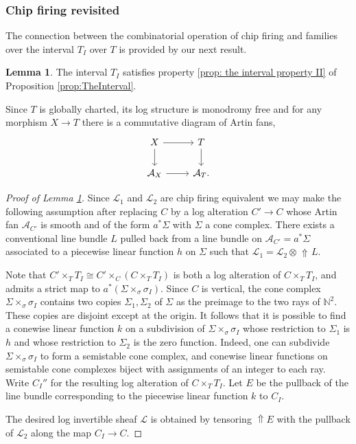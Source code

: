 \documentclass[11pt]{amsart}
\theoremstyle{definition}
\theoremstyle{definition}
\newtheorem{lemma}[theorem]{Lemma}
\DeclareMathOperator{\arrowup}{\!\Uparrow \!}
\begin{document}
\subsubsection{Chip firing revisited} The connection between the combinatorial operation of chip firing and families over the interval $T_I$ over $T$ is provided by our next result.

\begin{lemma}\label{lem:Part2KeyProp}
    The interval $T_I$ satisfies property \eqref{prop: the interval property II} of Proposition \ref{prop:TheInterval}.
\end{lemma}


Since $T$ is globally charted, its log structure is monodromy free and for any morphism $X\rightarrow T$ there is a commutative diagram of Artin fans,
    $$
    \begin{tikzcd}
X \arrow[r] \arrow[d] & T \arrow[d] \\
\mathcal{A}_X \arrow[r] & \mathcal{A}_T.
\end{tikzcd}
    $$


\begin{proof}[Proof of Lemma \ref{lem:Part2KeyProp}]
    Since $\mathcal{L}_1$ and $\mathcal{L}_2$ are chip firing equivalent we may make the following assumption after replacing $C$ by a log alteration $C'\rightarrow C$ whose Artin fan $\mathcal{A}_{C'}$ is smooth and of the form $a^\ast \Sigma$ with $\Sigma$ a cone complex.
    There exists a conventional line bundle $L$ pulled back from a line bundle on $\mathcal{A}_{C'} = a^\ast \Sigma$ associated to a piecewise linear function $h$ on $\Sigma$ 
    such that $\mathcal{L}_1 = \mathcal{L}_2 \otimes\arrowup L$. 
    

    Note that $C'\times_T T_I \cong C'\times_C(C\times_{T} T_I)$ is both a log alteration of $C\times_T T_I$, and admits a strict map to $a^\ast(\Sigma \times_\sigma \sigma_I)$. Since $C$ is vertical, the cone complex $\Sigma \times_{\sigma}\sigma_I$ contains two copies $\Sigma_1,\Sigma_2$ of $\Sigma$ as the preimage to the two rays of $\mathbb{N}^2$. These copies are disjoint except at the origin. It follows that it is possible to find a conewise linear function $k$ on a subdivision of $\Sigma \times_{\sigma}\sigma_I$ whose restriction to $\Sigma_1$ is $h$ and whose restriction to $\Sigma_2$ is the zero function. Indeed, one can subdivide $\Sigma \times_{\sigma}\sigma_I$ to form a semistable cone complex, and conewise linear functions on semistable cone complexes biject with assignments of an integer to each ray. Write $C_I''$ for the resulting log alteration of $C\times_T T_I$. Let $E$ be the pullback of the line bundle corresponding to the piecewise linear function $k$ to $C_I$.

    The desired log invertible sheaf $\mathcal{L}$ is obtained by tensoring $\Uparrow\!\! E$ with the pullback of $\mathcal{L}_2$ along the map $C_I\rightarrow C$.
\end{proof}
\end{document}
